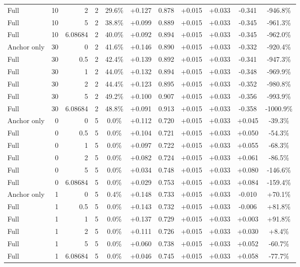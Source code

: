 \begin{table}[htbp]
\begin{tabular}{lrrrccccccc}
Full & 10 & 2 & 2 & 29.6\% & +0.127 & 0.878 & +0.015 & +0.033 & -0.341 & -946.8\% \\
Full & 10 & 5 & 2 & 38.8\% & +0.099 & 0.889 & +0.015 & +0.033 & -0.345 & -961.3\% \\
Full & 10 & 6.08684 & 2 & 40.0\% & +0.092 & 0.894 & +0.015 & +0.033 & -0.345 & -962.0\% \\
Anchor only & 30 & 0 & 2 & 41.6\% & +0.146 & 0.890 & +0.015 & +0.033 & -0.332 & -920.4\% \\
Full & 30 & 0.5 & 2 & 42.4\% & +0.139 & 0.892 & +0.015 & +0.033 & -0.341 & -947.3\% \\
Full & 30 & 1 & 2 & 44.0\% & +0.132 & 0.894 & +0.015 & +0.033 & -0.348 & -969.9\% \\
Full & 30 & 2 & 2 & 44.4\% & +0.123 & 0.895 & +0.015 & +0.033 & -0.352 & -980.8\% \\
Full & 30 & 5 & 2 & 49.2\% & +0.100 & 0.907 & +0.015 & +0.033 & -0.356 & -993.9\% \\
Full & 30 & 6.08684 & 2 & 48.8\% & +0.091 & 0.913 & +0.015 & +0.033 & -0.358 & -1000.9\% \\
Anchor only & 0 & 0 & 5 & 0.0\% & +0.112 & 0.720 & +0.015 & +0.033 & +0.045 & -39.3\% \\
Full & 0 & 0.5 & 5 & 0.0\% & +0.104 & 0.721 & +0.015 & +0.033 & +0.050 & -54.3\% \\
Full & 0 & 1 & 5 & 0.0\% & +0.097 & 0.722 & +0.015 & +0.033 & +0.055 & -68.3\% \\
Full & 0 & 2 & 5 & 0.0\% & +0.082 & 0.724 & +0.015 & +0.033 & +0.061 & -86.5\% \\
Full & 0 & 5 & 5 & 0.0\% & +0.034 & 0.748 & +0.015 & +0.033 & +0.080 & -146.6\% \\
Full & 0 & 6.08684 & 5 & 0.0\% & +0.029 & 0.753 & +0.015 & +0.033 & +0.084 & -159.4\% \\
Anchor only & 1 & 0 & 5 & 0.4\% & +0.148 & 0.733 & +0.015 & +0.033 & -0.010 & +70.1\% \\
Full & 1 & 0.5 & 5 & 0.0\% & +0.143 & 0.732 & +0.015 & +0.033 & -0.006 & +81.8\% \\
Full & 1 & 1 & 5 & 0.0\% & +0.137 & 0.729 & +0.015 & +0.033 & +0.003 & +91.8\% \\
Full & 1 & 2 & 5 & 0.0\% & +0.111 & 0.726 & +0.015 & +0.033 & +0.030 & +8.4\% \\
Full & 1 & 5 & 5 & 0.0\% & +0.060 & 0.738 & +0.015 & +0.033 & +0.052 & -60.7\% \\
Full & 1 & 6.08684 & 5 & 0.0\% & +0.046 & 0.745 & +0.015 & +0.033 & +0.058 & -77.7\% \\

\end{tabular}
\end{table}
